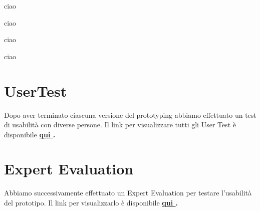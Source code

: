 \documentclass{article}
\begin{document}
\begin{minipage}{0.40\textwidth}
    ciao
    \vspace{1cm}
    
    ciao
    \vspace{1cm}
\end{minipage}    
\hspace{2cm}
\begin{minipage}{0.40\textwidth}
    ciao
    \vspace{1cm}

    ciao
    \vspace{1cm}
\end{minipage}
\section{UserTest} \par\vspace{0.5cm}

\par Dopo aver terminato ciascuna versione del prototyping abbiamo effettuato un test di usabilità con diverse persone.
Il link per visualizzare tutti gli User Test è disponibile \textbf{\href{https://www.notion.so/User-Testing-03a9697158cb4f93b3439fe694f33ac9}{qui }.}
\section{Expert Evaluation}
\par Abbiamo successivamente effettuato un Expert Evaluation per testare l'usabilità del prototipo.
Il link per visualizzarlo è disponibile \textbf{\href{https://www.notion.so/Expert-Evaluation-7bc49cae89414742a51b71f6faebecdd}{qui }.}

\vspace{1cm}
\end{document}
